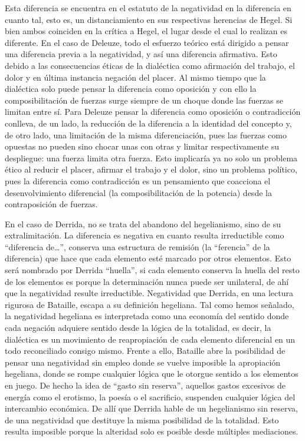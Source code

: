 Esta diferencia se encuentra en el estatuto de la negatividad en la
diferencia en cuanto tal, esto es, un distanciamiento en sus respectivas
herencias de Hegel. Si bien ambos coinciden en la crítica a Hegel, el
lugar desde el cual lo realizan es diferente. En el caso de Deleuze,
todo el esfuerzo teórico está dirigido a pensar una diferencia previa a
la negatividad, y así una diferencia afirmativa. Esto debido a las
consecuencias éticas de la dialéctica como afirmación del trabajo, el
dolor y en última instancia negación del placer. Al mismo tiempo que la
dialéctica solo puede pensar la diferencia como oposición y con ello la
composibilitación de fuerzas surge siempre de un choque donde las
fuerzas se limitan entre sí. Para Deleuze pensar la diferencia como
oposición o contradicción conlleva, de un lado, la reducción de la
diferencia a la identidad del concepto y, de otro lado, una limitación
de la misma diferenciación, pues las fuerzas como opuestas no pueden
sino chocar unas con otras y limitar respectivamente su despliegue: una
fuerza limita otra fuerza. Esto implicaría ya no solo un problema ético
al reducir el placer, afirmar el trabajo y el dolor, sino un problema
político, pues la diferencia como contradicción es un pensamiento que
coacciona el desenvolvimiento diferencial (la composibilitación de la
potencia) desde la contraposición de fuerzas.

En el caso de Derrida, no se trata del abandono del hegelianismo, sino
de su extralimitación. La diferencia es negativa en cuanto resulta
irreductible como \enquote{diferencia de\ldots}, conserva una estructura de
remisión (la \enquote{ferencia} de la diferencia) que hace que cada elemento
esté marcado por otros elementos. Esto será nombrado por Derrida
\enquote{huella}, si cada elemento conserva la huella del resto de los elementos
es porque la determinación nunca puede ser unilateral, de ahí que la
negatividad resulte irreductible. Negatividad que Derrida, en una
lectura rigurosa de Bataille, escapa a su definición hegeliana. Tal como
hemos señalado, la negatividad hegeliana es interpretada como una
economía del sentido donde cada negación adquiere sentido desde la
lógica de la totalidad, es decir, la dialéctica es un movimiento de
reapropiación de cada elemento diferencial en un todo reconciliado
consigo mismo. Frente a ello, Bataille abre la posibilidad de pensar una
negatividad sin empleo donde se vuelve imposible la apropiación
hegeliana, donde se rompe cualquier lógica que le otorgue sentido a los
elementos en juego. De hecho la idea de \enquote{gasto sin reserva}, aquellos
gastos excesivos de energía como el erotismo, la poesía o el sacrificio,
suspenden cualquier lógica del intercambio económica. De allí que
Derrida hable de un hegelianismo sin reserva, de una negatividad que
destituye la misma posibilidad de la totalidad. Esto resulta imposible
porque la alteridad solo es posible desde múltiples mediaciones.

